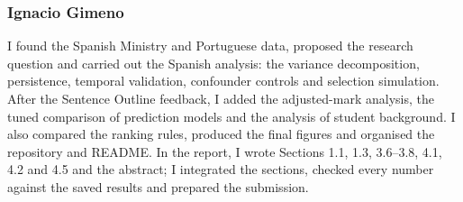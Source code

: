 
\subsubsection*{Ignacio Gimeno}
I found the Spanish Ministry and Portuguese data, proposed the research question and carried out the Spanish analysis: the variance decomposition, persistence, temporal validation, confounder controls and selection simulation. After the Sentence Outline feedback, I added the adjusted-mark analysis, the tuned comparison of prediction models and the analysis of student background. I also compared the ranking rules, produced the final figures and organised the repository and README. In the report, I wrote Sections 1.1, 1.3, 3.6--3.8, 4.1, 4.2 and 4.5 and the abstract; I integrated the sections, checked every number against the saved results and prepared the submission.
